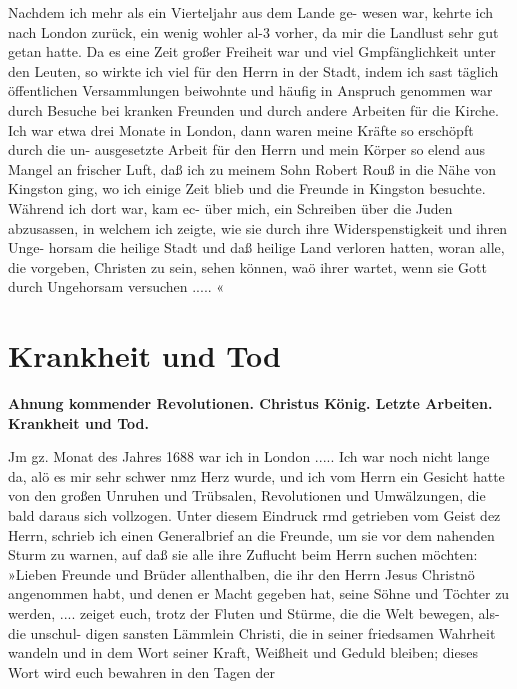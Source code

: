 Nachdem ich mehr als ein Vierteljahr aus dem Lande ge-
wesen war, kehrte ich nach London zurück, ein wenig wohler al-3
vorher, da mir die Landlust sehr gut getan hatte. Da es eine
Zeit großer Freiheit war und viel Gmpfänglichkeit unter den
Leuten, so wirkte ich viel für den Herrn in der Stadt, indem ich
sast täglich öffentlichen Versammlungen beiwohnte und häufig in
Anspruch genommen war durch Besuche bei kranken Freunden und
durch andere Arbeiten für die Kirche. Ich war etwa drei Monate
in London, dann waren meine Kräfte so erschöpft durch die un-
ausgesetzte Arbeit für den Herrn und mein Körper so elend aus
Mangel an frischer Luft, daß ich zu meinem Sohn Robert Rouß
in die Nähe von Kingston ging, wo ich einige Zeit blieb und die
Freunde in Kingston besuchte. Während ich dort war, kam ec-
über mich, ein Schreiben über die Juden abzusassen, in welchem
ich zeigte, wie sie durch ihre Widerspenstigkeit und ihren Unge-
horsam die heilige Stadt und daß heilige Land verloren hatten,
woran alle, die vorgeben, Christen zu sein, sehen können, waö
ihrer wartet, wenn sie Gott durch Ungehorsam versuchen ..... «


\chapter[Krankheit und Tod]{Krankheit und Tod}

\begin{center}
\textbf{Ahnung kommender Revolutionen. Christus König. Letzte
Arbeiten. Krankheit und Tod.}
\end{center}

Jm gz. Monat des Jahres 1688 war ich in London .....
Ich war noch nicht lange da, alö es mir sehr schwer nmz Herz
wurde, und ich vom Herrn ein Gesicht hatte von den großen
Unruhen und Trübsalen, Revolutionen und Umwälzungen, die bald
daraus sich vollzogen. Unter diesem Eindruck rmd getrieben vom
Geist dez Herrn, schrieb ich einen Generalbrief an die Freunde,
um sie vor dem nahenden Sturm zu warnen, auf daß sie alle
ihre Zuflucht beim Herrn suchen möchten:
»Lieben Freunde und Brüder allenthalben, die ihr den Herrn
Jesus Christnö angenommen habt, und denen er Macht gegeben
hat, seine Söhne und Töchter zu werden, .... zeiget euch, trotz
der Fluten und Stürme, die die Welt bewegen, als- die unschul-
digen sansten Lämmlein Christi, die in seiner friedsamen Wahrheit
wandeln und in dem Wort seiner Kraft, Weißheit und Geduld
bleiben; dieses Wort wird euch bewahren in den Tagen der


